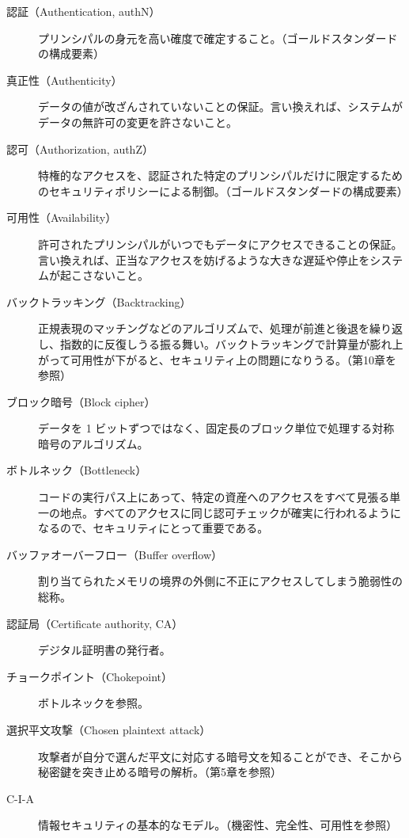 \documentclass[uplatex]{jsarticle}
\begin{document}
\begin{description}
\item[認証（Authentication, authN）]
プリンシパルの身元を高い確度で確定すること。（ゴールドスタンダードの構成要素）

\item[真正性（Authenticity）]
データの値が改ざんされていないことの保証。言い換えれば、システムがデータの無許可の変更を許さないこと。

\item[認可（Authorization, authZ）]
特権的なアクセスを、認証された特定のプリンシパルだけに限定するためのセキュリティポリシーによる制御。（ゴールドスタンダードの構成要素）

\item[可用性（Availability）]
許可されたプリンシパルがいつでもデータにアクセスできることの保証。言い換えれば、正当なアクセスを妨げるような大きな遅延や停止をシステムが起こさないこと。

\item[バックトラッキング（Backtracking）]
正規表現のマッチングなどのアルゴリズムで、処理が前進と後退を繰り返し、指数的に反復しうる振る舞い。バックトラッキングで計算量が膨れ上がって可用性が下がると、セキュリティ上の問題になりうる。（第10章を参照）

\item[ブロック暗号（Block cipher）]
データを 1 ビットずつではなく、固定長のブロック単位で処理する対称暗号のアルゴリズム。

\item[ボトルネック（Bottleneck）]
コードの実行パス上にあって、特定の資産へのアクセスをすべて見張る単一の地点。すべてのアクセスに同じ認可チェックが確実に行われるようになるので、セキュリティにとって重要である。

\item[バッファオーバーフロー（Buffer overflow）]
割り当てられたメモリの境界の外側に不正にアクセスしてしまう脆弱性の総称。

\item[認証局（Certificate authority, CA）]
デジタル証明書の発行者。

\item[チョークポイント（Chokepoint）]
ボトルネックを参照。

\item[選択平文攻撃（Chosen plaintext attack）]
攻撃者が自分で選んだ平文に対応する暗号文を知ることができ、そこから秘密鍵を突き止める暗号の解析。（第5章を参照）

\item[C-I-A]
情報セキュリティの基本的なモデル。（機密性、完全性、可用性を参照）


\end{description}
\end{document}
